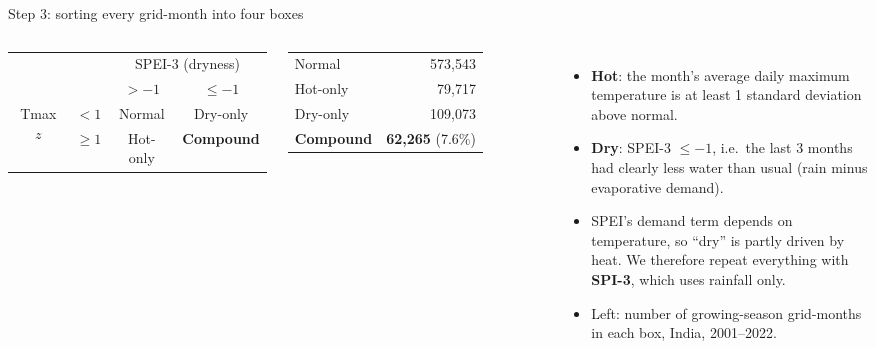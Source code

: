 \documentclass[11pt,aspectratio=169]{beamer}
\begin{document}
\begin{frame}{Step 3: sorting every grid-month into four boxes}
  \begin{columns}
    \centering
    \renewcommand{\arraystretch}{1.4}
    \begin{tabular}{cc|c|c}
      & & \multicolumn{2}{c}{SPEI-3 (dryness)} \\
      & & $> -1$ & $\le -1$ \\
      \hline
      \multirow{2}{*}{Tmax $z$} & $< 1$ & Normal & Dry-only \\
      & $\ge 1$ & Hot-only & \textbf{Compound} \\
    \end{tabular}

    \vspace{6pt}
    \scriptsize
    \begin{tabular}{@{}lr@{}}
      Normal & 573,543 \\
      Hot-only & 79,717 \\
      Dry-only & 109,073 \\
      \textbf{Compound} & \textbf{62,265} (7.6\%) \\
    \end{tabular}
    \scriptsize
    \begin{itemize}
      \item \textbf{Hot}: the month's average daily maximum temperature is at
        least 1 standard deviation above normal.
      \item \textbf{Dry}: SPEI-3 $\le -1$, i.e.\ the last 3 months had
        clearly less water than usual (rain minus evaporative demand).
      \item SPEI's demand term depends on temperature, so ``dry'' is partly
        driven by heat. We therefore repeat everything with
        \textbf{SPI-3}, which uses rainfall only.
      \item Left: number of growing-season grid-months in each box, India,
        2001--2022.
    \end{itemize}
  \end{columns}
\end{frame}
\end{document}
